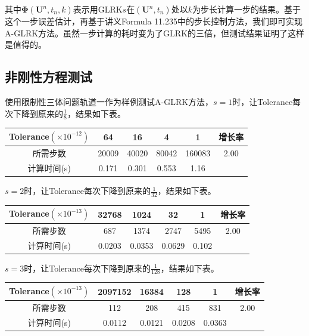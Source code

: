 \documentclass[lang=cn,10pt,bibend=bibtex]{elegantbook}
\begin{document}
其中$\mathbf{\Phi}(\mathbf{U}^{n},t_n,k)$表示用GLRK$s$在$(\mathbf{U}^{n},t_n)$处以$k$为步长计算一步的结果。基于这个一步误差估计，再基于讲义Formula 11.235中的步长控制方法，我们即可实现A-GLRK方法。虽然一步计算的耗时变为了GLRK的三倍，但测试结果证明了这样是值得的。

\subsection{非刚性方程测试}

使用限制性三体问题轨道一作为样例测试A-GLRK方法，$s=1$时，让Tolerance每次下降到原来的$\frac{1}{8}$，结果如下表。

\begin{table}[H]
  \centering
  \begin{tabular}{c|cccc|c}
    Tolerance$(\times 10^{-12})$ & 64 & 16 & 4 & 1 & 增长率 \\ \hline
    所需步数 & 20009 & 40020  & 80042 & 160083 & 2.00   \\
    计算时间(s) & 0.171 & 0.301  & 0.553  & 1.16 & 
  \end{tabular}
\end{table}

$s=2$时，让Tolerance每次下降到原来的$\frac{1}{32}$，结果如下表。

\vspace{-.5em}
\begin{table}[H]
  \centering
  \begin{tabular}{c|cccc|c}
    Tolerance$(\times 10^{-13})$ & 32768 & 1024 & 32 & 1 & 增长率 \\ \hline
    所需步数 & 687 & 1374  & 2747 & 5495 & 2.00   \\
    计算时间(s) & 0.0203 & 0.0353 & 0.0629  & 0.102  & 
  \end{tabular}
\end{table}
\vspace{-.8em}

$s=3$时，让Tolerance每次下降到原来的$\frac{1}{128}$，结果如下表。

\vspace{-.8em}
\begin{table}[H]
  \centering
  \begin{tabular}{c|cccc|c}
    Tolerance$(\times 10^{-13})$ & 2097152 & 16384 & 128 & 1 & 增长率 \\ \hline
    所需步数 & 112 & 208  & 415 & 831 & 2.00   \\
    计算时间(s) & 0.0112 & 0.0121  & 0.0208  & 0.0363 & 
  \end{tabular}
\end{table}
\vspace{-.8em}
\end{document}

